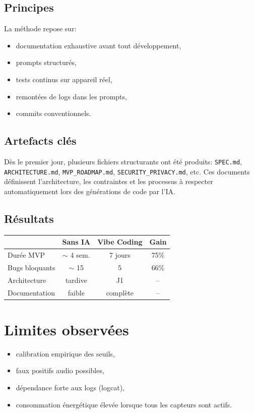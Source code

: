 \documentclass[11pt,a4paper]{article}
\begin{document}
\subsection{Principes}
La méthode repose sur:
\begin{itemize}
    \item documentation exhaustive avant tout développement,
    \item prompts structurés,
    \item tests continus sur appareil réel,
    \item remontées de logs dans les prompts,
    \item commits conventionnels.
\end{itemize}

\subsection{Artefacts clés}
Dès le premier jour, plusieurs fichiers structurants ont été produits:
\texttt{SPEC.md}, \texttt{ARCHITECTURE.md}, \texttt{MVP\_ROADMAP.md}, \texttt{SECURITY\_PRIVACY.md}, etc.
Ces documents définissent l'architecture, les contraintes et les processus à respecter automatiquement lors des générations de code par l'IA.

\subsection{Résultats}
\begin{center}
\begin{tabular}{lccc}
\toprule
 & Sans IA & Vibe Coding & Gain\\
\midrule
Durée MVP & $\sim$ 4 sem. & 7 jours & 75\%\\
Bugs bloquants & $\sim$ 15 & 5 & 66\%\\
Architecture & tardive & J1 & --\\
Documentation & faible & complète & --\\
\bottomrule
\end{tabular}
\end{center}


\section{Limites observées}

\begin{itemize}
    \item calibration empirique des seuils,
    \item faux positifs audio possibles,
    \item dépendance forte aux logs (logcat),
    \item consommation énergétique élevée lorsque tous les capteurs sont actifs.
\end{itemize}
\end{document}

